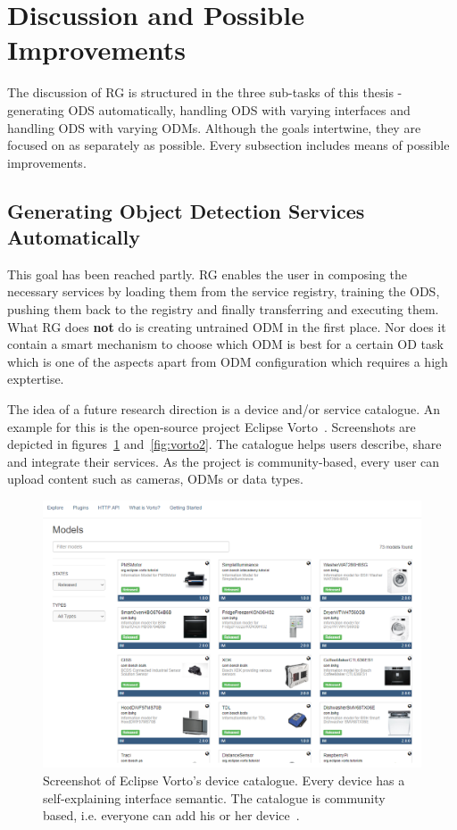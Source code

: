 \section{Discussion and Possible Improvements}
The discussion of RG is structured in the three sub-tasks of this thesis - generating ODS automatically, handling ODS with varying interfaces and handling ODS with varying ODMs. Although the goals intertwine, they are focused on as separately as possible. Every subsection includes means of possible improvements.

\subsection{Generating Object Detection Services Automatically}
This goal has been reached partly. RG enables the user in composing the necessary services by loading them from the service registry, training the ODS, pushing them back to the registry and finally transferring and executing them. What RG does \textbf{not} do is creating untrained ODM in the first place. Nor does it contain a smart mechanism to choose which ODM is best for a certain OD task which is one of the aspects apart from ODM configuration which requires a high exptertise.

The idea of a future research direction is a device and/or service catalogue. An example for this is the open-source project Eclipse Vorto~\cite{Eclipse2019Vorto2019}. Screenshots are depicted in figures~\ref{fig:vorto} and~\ref{fig:vorto2}. The catalogue helps users describe, share and integrate their services. As the project is community-based, every user can upload content such as cameras, ODMs or data types.

\begin{landscape}
\begin{figure}[ht]
    \centering
    \includegraphics[width=1.3\textwidth]{img/EclipseVorto.png}
    \caption[Eclipse Vorto's device catalogue]{Screenshot of Eclipse Vorto's device catalogue. Every device has a self-explaining interface semantic. The catalogue is community based, i.e. everyone can add his or her device~\cite{Eclipse2019Vorto2019}.}
    \label{fig:vorto}
\end{figure}
\end{landscape}

